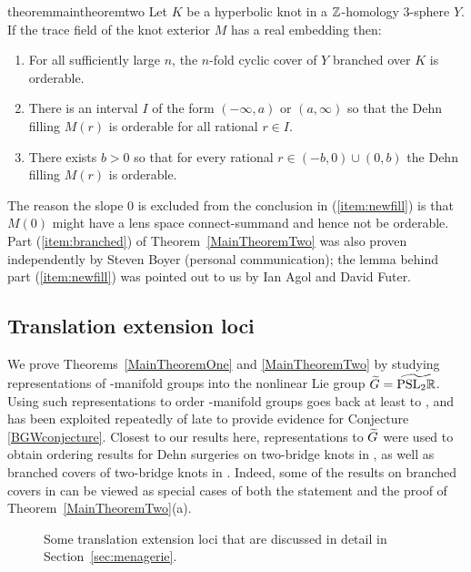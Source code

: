 \documentclass[tikz, sepfignums, defaultenums]{nmd/article}
\begin{document}
\begin{restatable}{theorem}{maintheoremtwo}
  \label{MainTheoremTwo}
  Let $K$ be a hyperbolic knot in a ${\mathbb Z}$-homology 3-sphere $Y$. If the
  trace field of the knot exterior $M$ has a real embedding then:
\begin{enumerate}
  \item\label{item:branched}
    For all sufficiently large $n$, the $n$-fold cyclic 
    cover of $Y$ branched over $K$ is orderable.
  \item\label{item:fill} There is an interval $I$ of the form
    $(-\infty, a)$ or $(a, \infty)$ so that the Dehn filling $M(r)$ is
    orderable for all rational $r \in I$.
  \item \label{item:newfill} There exists $b >0$ so that for every rational
    $r \in (-b, 0) \cup (0, b)$ the Dehn filling $M(r)$ is orderable.
\end{enumerate}
\end{restatable}
\noindent
The reason the slope $0$ is excluded from the conclusion in
(\ref{item:newfill}) is that $M(0)$ might have a lens space
connect-summand and hence not be orderable. Part (\ref{item:branched})
of Theorem~\ref{MainTheoremTwo} was also proven independently by
Steven Boyer (personal communication); the lemma behind part
(\ref{item:newfill}) was pointed out to us by Ian Agol and David
Futer.



\subsection{Translation extension loci}
\FloatBarrier
We prove Theorems~\ref{MainTheoremOne} and \ref{MainTheoremTwo} by
studying representations of \3-manifold groups into the nonlinear Lie
group $\Gtil = \PSLRtilde$.  Using such representations to order
\3-manifold groups goes back at least to
\cite{EisenbudHirschNeumann1981}, and has been exploited repeatedly of
late to provide evidence for Conjecture \ref{BGWconjecture}.  Closest
to our results here, representations to $\Gtil $ were used to obtain
ordering results for Dehn surgeries on two-bridge knots in
\cite{HakamataTeragaito2014, Tran2015c}, as well as branched covers of
two-bridge knots in \cite{Hu2015, Tran2015b}.  Indeed, some of the
results on branched covers in \cite{Hu2015, Tran2015b, Gordon2016} can be viewed
as special cases of both the statement and the proof of
Theorem~\ref{MainTheoremTwo}(a).

\begin{figure}
  \begin{center}
    \hspace{3pt}

    \vspace{0.4cm}

  \end{center}
  \caption{Some translation extension loci that are discussed in
    detail in Section~\ref{sec:menagerie}.}
  \label{fig:transexs}
\end{figure}
\end{document}
